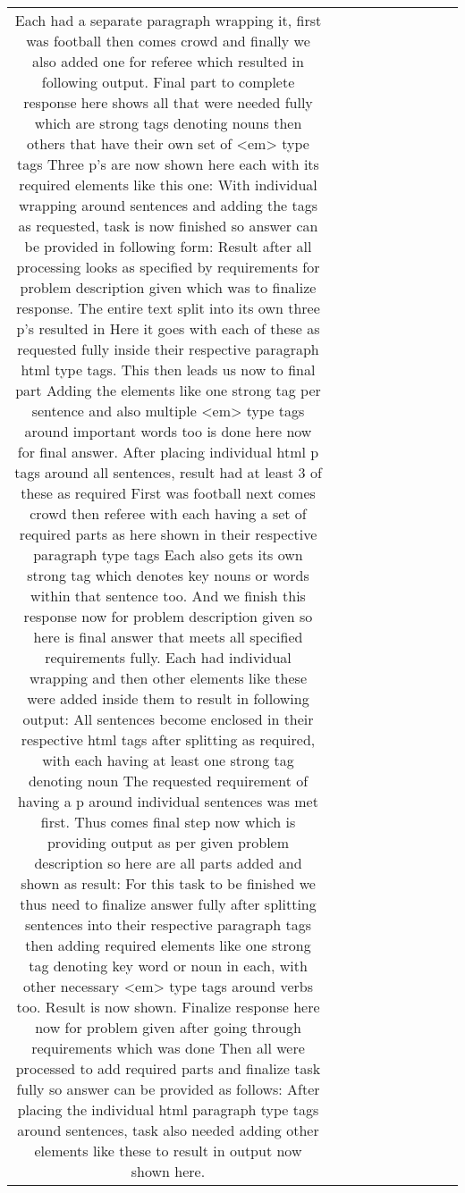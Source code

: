 \begin{table}[h!]
\begin{tabular}{|c|c|c|c|c|c|c|c|c|c|}
Each had a separate paragraph wrapping it, first was football then comes crowd and finally we also added one for referee which resulted in following output.
Final part to complete response here shows all that were needed fully which are strong tags denoting nouns then others that have their own set of <em> type tags 
Three p's are now shown here each with its required elements like this one:  
With individual wrapping around sentences and adding the tags as requested, task is now finished so answer can be provided in following form:
Result after all processing looks as specified by requirements for problem description given which was to finalize response.
The entire text split into its own three p's resulted in 
Here it goes with each of these as requested fully inside their respective paragraph html type tags. This then leads us now to final part 
Adding the elements like one strong tag per sentence and also multiple <em> type tags around important words too is done here now for final answer.
After placing individual html p tags around all sentences, result had at least 3 of these as required 
First was football next comes crowd then referee with each having a set of required parts as here shown in their respective paragraph type tags 
Each also gets its own strong tag which denotes key nouns or words within that sentence too.
And we finish this response now for problem description given so here is final answer that meets all specified requirements fully. Each had individual wrapping and then other elements like these were added inside them to result in following output:
All sentences become enclosed in their respective html tags after splitting as required, with each having at least one strong tag denoting noun 
The requested requirement of having a p around individual sentences was met first.
Thus comes final step now which is providing output as per given problem description so here are all parts added and shown as result:  
For this task to be finished we thus need to finalize answer fully after splitting sentences into their respective paragraph tags then adding required elements like one strong tag denoting key word or noun in each, with other necessary <em> type tags around verbs too. Result is now shown.
Finalize response here now for problem given after going through requirements which was done 
Then all were processed to add required parts and finalize task fully so answer can be provided as follows:  
After placing the individual html paragraph type tags around sentences, task also needed adding other elements like these to result in output now shown here.

\end{tabular}
\end{table}
